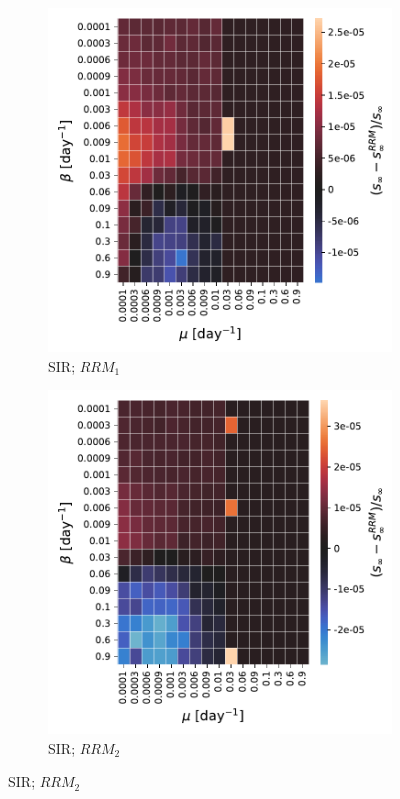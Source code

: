 \documentclass[a4paper,11pt, twocolumn]{article}
\begin{document}
\begin{figure}[H]
\begin{subfigure}[t]{0.24\textwidth}
\centering
\includegraphics[scale=0.32]{./Figure/Simulations/SIR_temporal_RRM_nodes_96848_diff.pdf}
\caption{SIR; $RRM_1$}
\end{subfigure}
\begin{subfigure}[t]{0.24\textwidth}
 \centering
\includegraphics[scale=0.32]{./Figure/Simulations/SIR_temporal_RRM_time_19836_diff.pdf}
\caption{SIR; $RRM_2$}
\end{subfigure}


\end{figure}
\end{document}
